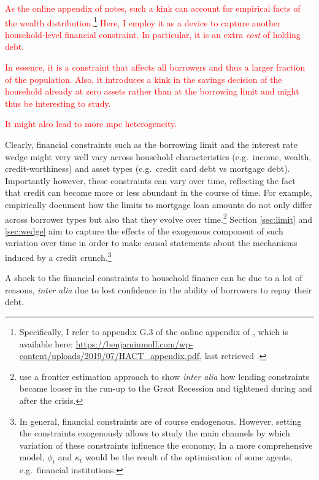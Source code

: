 \documentclass[12pt]{article} %
\numberwithin{equation}{section} %
\numberwithin{figure}{section}
\numberwithin{table}{section}
\begin{document}
\textcolor{red}{As the online appendix of \textcite{achdou2022} notes, such a kink can account for empirical facts of the wealth distribution.\footnote{Specifically, I refer to appendix G.3 of the online appendix of \textcite{achdou2022}, which is available here: \url{https://benjaminmoll.com/wp-content/uploads/2019/07/HACT_appendix.pdf}, last retrieved .} Here, I employ it as a device to capture another household-level financial constraint. In particular, it is an extra \textit{cost} of holding debt.}

\textcolor{red}{In essence, it is a constraint that affects all borrowers and thus a larger fraction of the population. Also, it introduces a kink in the savings decision of the household already at zero assets rather than at the borrowing limit and might thus be interesting to study.}

\textcolor{red}{It might also lead to more \Gls{mpc} heterogeneity.}

Clearly, financial constraints such as the borrowing limit and the interest rate wedge might very well vary across household characteristics (e.g.~income, wealth, credit-worthiness) and asset types (e.g.~credit card debt vs mortgage debt). Importantly however, these constraints can vary over time, reflecting the fact that credit can become more or less abundant in the course of time. For example, \textcite{anenberg2018} empirically document how the limits to mortgage loan amounts do not only differ across borrower types but also that they evolve over time.\footnote{\textcite{anenberg2018} use a frontier estimation approach to show \textit{inter alia} how lending constraints became looser in the run-up to the Great Recession and tightened during and after the crisis.} Section \ref{sec:limit} and \ref{sec:wedge} aim to capture the effects of the exogenous component of such variation over time in order to make causal statements about the mechanisms induced by a credit crunch.\footnote{In general, financial constraints are of course endogenous. However, setting the constraints exogenously allows to study the main channels by which variation of these constraints influence the economy. In a more comprehensive model, $\phi_t$ and $\kappa_t$ would be the result of the optimisation of some agents, e.g.~financial institutions.}

A shock to the financial constraints to household finance can be due to a lot of reasons, \textit{inter alia} due to lost confidence in the ability of borrowers to repay their debt.
\end{document}

